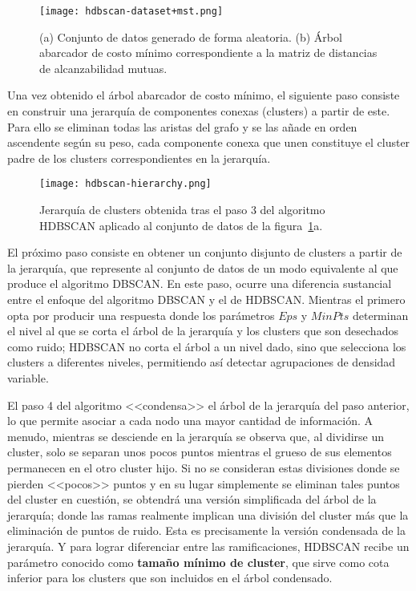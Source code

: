 \begin{figure}[!h]
    \centering
    \texttt{[image: hdbscan-dataset+mst.png]}
    \caption{(a) Conjunto de datos generado de forma aleatoria. (b) Árbol abarcador de costo mínimo correspondiente a la matriz de distancias de alcanzabilidad mutuas.}
    \label{img:hdbscan-dataset+mst}
\end{figure}

Una vez obtenido el árbol abarcador de costo mínimo, el siguiente paso consiste en construir una jerarquía de componentes conexas (clusters) a partir de este.
Para ello se eliminan todas las aristas del grafo y se las añade en orden ascendente según su peso, cada componente conexa que unen constituye el cluster padre de los clusters correspondientes en la jerarquía.

\begin{figure}[!h]
    \centering
    \texttt{[image: hdbscan-hierarchy.png]}
    \caption{Jerarquía de clusters obtenida tras el paso 3 del algoritmo HDBSCAN aplicado al conjunto de datos de la figura~\ref{img:hdbscan-dataset+mst}a.}
    \label{img:hdbscan-hierarchy}
\end{figure}

El próximo paso consiste en obtener un conjunto disjunto de clusters a partir de la jerarquía, que represente al conjunto de datos de un modo equivalente al que produce el algoritmo DBSCAN\@.
En este paso, ocurre una diferencia sustancial entre el enfoque del algoritmo DBSCAN y el de HDBSCAN\@.
Mientras el primero opta por producir una respuesta donde los parámetros $Eps$ y $MinPts$ determinan el nivel al que se corta el árbol de la jerarquía y los clusters que son desechados como ruido;
HDBSCAN no corta el árbol a un nivel dado, sino que selecciona los clusters a diferentes niveles, permitiendo así detectar agrupaciones de densidad variable.

El paso 4 del algoritmo <<condensa>> el árbol de la jerarquía del paso anterior, lo que permite asociar a cada nodo una mayor cantidad de información.
A menudo, mientras se desciende en la jerarquía se observa que, al dividirse un cluster, solo se separan unos pocos puntos mientras el grueso de sus elementos permanecen en el otro cluster hijo.
Si no se consideran estas divisiones donde se pierden <<pocos>> puntos y en su lugar simplemente se eliminan tales puntos del cluster en cuestión, se obtendrá una versión simplificada del árbol de la jerarquía;
donde las ramas realmente implican una división del cluster más que la eliminación de puntos de ruido.
Esta es precisamente la versión condensada de la jerarquía.
Y para lograr diferenciar entre las ramificaciones, HDBSCAN recibe un parámetro conocido como \textbf{tamaño mínimo de cluster}, que sirve como cota inferior para los clusters que son incluidos en el árbol condensado.

